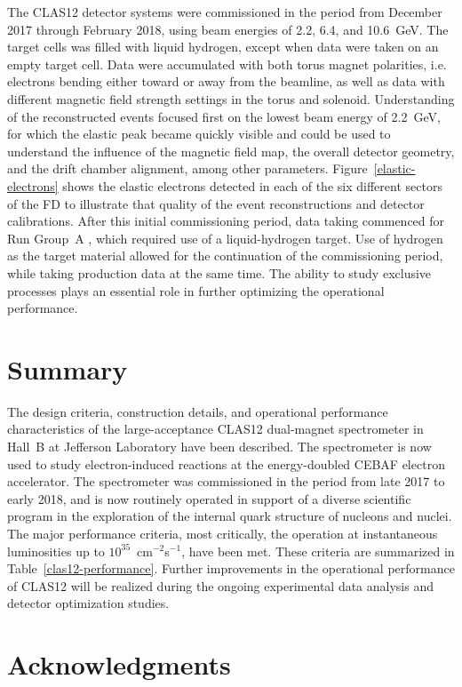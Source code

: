 \documentclass[final,3p,twocolumn]{elsarticle}
\begin{document}
The CLAS12 detector systems were commissioned in the period from December 2017 through February 2018, using
beam energies of 2.2, 6.4, and 10.6~GeV. The target cells was filled with liquid hydrogen, except when data were taken
on an empty target cell. Data were accumulated with both torus magnet polarities, i.e. electrons bending either toward
or away from the beamline, as well as data with different magnetic field strength settings in the torus and solenoid.
Understanding of the reconstructed events focused first on the lowest beam energy of 2.2~GeV, for which the elastic
peak became quickly visible and could be used to understand the influence of the magnetic field map, the overall detector
geometry, and the drift chamber alignment, among other parameters. Figure~\ref{elastic-electrons} shows the elastic
electrons detected in each of the six different sectors of the FD to illustrate that quality of the event reconstructions
and detector calibrations. After this initial commissioning period, data taking commenced for Run Group~A
\cite{rg-details}, which required use of a liquid-hydrogen target. Use of hydrogen as the target material allowed for
the continuation of the commissioning period, while taking production data at the same time. The ability to study
exclusive processes plays an essential role in further optimizing the operational performance. 

\section{Summary} 

The design criteria, construction details, and operational performance characteristics of the large-acceptance
CLAS12 dual-magnet spectrometer in Hall~B at Jefferson Laboratory have been described. The spectrometer is
now used to study electron-induced reactions at the energy-doubled CEBAF electron accelerator. The spectrometer
was commissioned in the period from late 2017 to early 2018, and is now routinely operated in support of a diverse
scientific program in the exploration of the internal quark structure of nucleons and nuclei. The major performance
criteria, most critically, the operation at  instantaneous luminosities up to $10^{35}$~cm$^{-2}$s$^{-1}$, have been met.
These criteria are summarized in Table~\ref{clas12-performance}. Further improvements in the operational
performance of CLAS12 will be realized during the ongoing experimental data analysis and detector optimization
studies.

\section*{Acknowledgments}
\end{document}

